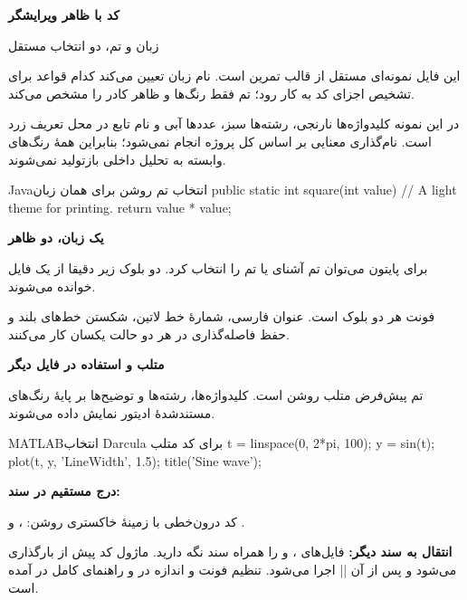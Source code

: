\documentclass[\AssignmentBaseSize,a4paper]{article}
\begin{document}
{\LARGE\bfseries کد با ظاهر ویرایشگر}\par
{\large زبان و تم، دو انتخاب مستقل}\par
این فایل نمونه‌ای مستقل از قالب تمرین است. نام زبان تعیین می‌کند کدام
قواعد برای تشخیص اجزای کد به کار رود؛ تم فقط رنگ‌ها و ظاهر کادر را مشخص می‌کند.

در این نمونه کلیدواژه‌ها نارنجی، رشته‌ها سبز، عددها آبی و نام تابع در محل
تعریف زرد است. نام‌گذاری معنایی بر اساس کل پروژه انجام نمی‌شود؛ بنابراین
همهٔ رنگ‌های وابسته به تحلیل داخلی  بازتولید نمی‌شوند.

\begin{codeblock}[theme=intellij-light]{Java}{انتخاب تم روشن برای همان زبان}
public static int square(int value) {
    // A light theme for printing.
    return value * value;
}
\end{codeblock}

\newpage
{\LARGE\bfseries یک زبان، دو ظاهر}\par
برای پایتون می‌توان تم آشنای  یا تم 
را انتخاب کرد. دو بلوک زیر دقیقا از یک فایل خوانده می‌شوند.

فونت هر دو بلوک  است. عنوان فارسی، شمارهٔ خط لاتین،
شکستن خط‌های بلند و حفظ فاصله‌گذاری در هر دو حالت یکسان کار می‌کنند.

\newpage
{\LARGE\bfseries متلب و استفاده در فایل دیگر}\par
تم پیش‌فرض متلب روشن است. کلیدواژه‌ها، رشته‌ها و توضیح‌ها بر پایهٔ رنگ‌های
مستندشدهٔ ادیتور  نمایش داده می‌شوند.

\begin{codeblock}[theme=darcula]{MATLAB}{انتخاب Darcula برای کد متلب}
t = linspace(0, 2*pi, 100);
y = sin(t);
plot(t, y, 'LineWidth', 1.5);
title('Sine wave');
\end{codeblock}

\textbf{درج مستقیم در سند:}

کد درون‌خطی با زمینهٔ خاکستری روشن:
،  و .

\textbf{انتقال به سند دیگر:}
فایل‌های ،  و
 را همراه سند نگه دارید. ماژول کد پیش از
 بارگذاری می‌شود و پس از آن
\codeinline|\ApplyAssignmentFonts| اجرا می‌شود.
تنظیم فونت و اندازه در  و راهنمای کامل در
 آمده است.
\end{document}
